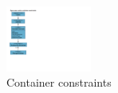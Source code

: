 \begin{figure}[H]
  \centering
  \includegraphics[trim={10mm 54mm 212mm 18mm}, clip,
    width=0.25\textwidth]{images/centre-container-constraint}
  \caption{Container constraints}
  \label{fig:container-constraint}
\end{figure}

